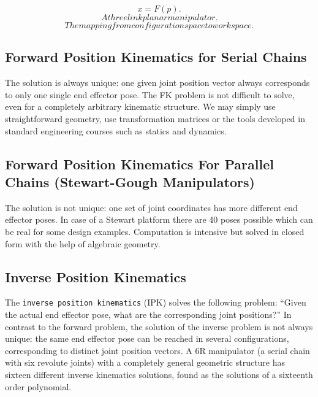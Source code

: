 \[x = F(p).\]\[A three link planar manipulator.\]\[The mapping from configuration space to
workspace.\]

\hypertarget{forward-position-kinematics-for-serial-chains}{%
\subsection{Forward Position Kinematics for Serial
Chains}\label{forward-position-kinematics-for-serial-chains}}

The solution is always unique: one given joint position vector always
corresponds to only one single end effector pose. The FK problem is not
difficult to solve, even for a completely arbitrary kinematic structure.
We may simply use straightforward geometry, use transformation matrices
or the tools developed in standard engineering courses such as statics
and dynamics.

\hypertarget{forward-position-kinematics-for-parallel-chains-stewart-gough-manipulators}{%
\subsection{Forward Position Kinematics For Parallel Chains
(Stewart-Gough
Manipulators)}\label{forward-position-kinematics-for-parallel-chains-stewart-gough-manipulators}}

The solution is not unique: one set of joint coordinates has more
different end effector poses. In case of a Stewart platform there are 40
poses possible which can be real for some design examples. Computation
is intensive but solved in closed form with the help of algebraic
geometry.

\hypertarget{inverse-position-kinematics}{%
\subsection{Inverse Position
Kinematics}\label{inverse-position-kinematics}}

The \texttt{inverse\ position\ kinematics} (IPK) solves the following
problem: ``Given the actual end effector pose, what are the
corresponding joint positions?'' In contrast to the forward problem, the
solution of the inverse problem is not always unique: the same end
effector pose can be reached in several configurations, corresponding to
distinct joint position vectors. A 6R manipulator (a serial chain with
six revolute joints) with a completely general geometric structure has
sixteen different inverse kinematics solutions, found as the solutions
of a sixteenth order polynomial.

